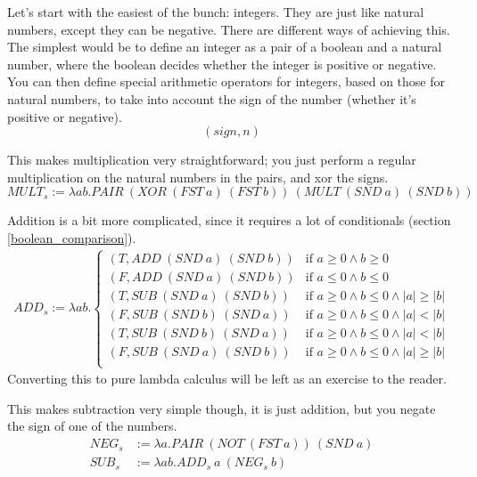 \documentclass[11pt]{article}
\begin{document}
Let's start with the easiest of the bunch: integers. They are just like natural
numbers, except they can be negative. There are different ways of achieving
this. The simplest would be to define an integer as a pair of a boolean and a
natural number, where the boolean decides whether the integer is positive or
negative. You can then define special arithmetic operators for integers, based
on those for natural numbers, to take into account the sign of the number
(whether it's positive or negative).
\[(sign,n)\]

This makes multiplication very straightforward; you just perform a regular
multiplication on the natural numbers in the pairs, and xor the signs.
\[MULT_s:=\lambda ab.PAIR\ (XOR\ (FST\ a)\ (FST\ b))\ (MULT\ (SND\ a)\ (SND\ b))\]

Addition is a bit more complicated, since it requires a lot of conditionals
(section \ref{boolean_comparison}).
\begin{align*}
	ADD_s:=\lambda ab.\left\{
		\begin{array}{ll}
			(T, ADD\ (SND\ a)\ (SND\ b))
				&\mbox{if } a \geq 0 \wedge b \geq 0 \\
			(F, ADD\ (SND\ a)\ (SND\ b))
				&\mbox{if } a \le 0 \wedge b \le 0 \\
			(T, SUB\ (SND\ a)\ (SND\ b))
				&\mbox{if } a \geq 0 \wedge b \le 0 \wedge \lvert a \rvert \geq \lvert b \rvert \\
			(F, SUB\ (SND\ b)\ (SND\ a))
				&\mbox{if } a \geq 0 \wedge b \le 0 \wedge \lvert a \rvert < \lvert b \rvert \\
			(T, SUB\ (SND\ b)\ (SND\ a))
				&\mbox{if } a \geq 0 \wedge b \le 0 \wedge \lvert a \rvert < \lvert b \rvert \\
			(F, SUB\ (SND\ a)\ (SND\ b))
				&\mbox{if } a \geq 0 \wedge b \le 0 \wedge \lvert a \rvert \geq \lvert b \rvert \\
		\end{array}
	\right.
\end{align*}
Converting this to pure lambda calculus will be left as an exercise to the
reader.

This makes subtraction very simple though, it is just addition, but you negate
the sign of one of the numbers.
\begin{align*}
	NEG_s&:=\lambda a.PAIR\ (NOT\ (FST\ a))\ (SND\ a) \\
	SUB_s&:=\lambda ab.ADD_s\ a\ (NEG_s\ b)
\end{align*}
\end{document}
